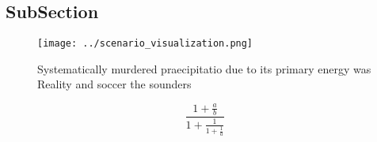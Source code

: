 \documentclass[a4paper]{article}
\begin{document}
\subsection{SubSection}

\begin{figure}
\centering
\texttt{[image: ../scenario\_visualization.png]}
\caption{Systematically murdered praecipitatio due to its primary energy was Reality and soccer the sounders
}
\end{figure}
 
\[ \frac{1+\frac{a}{b}}{1+\frac{1}{1+\frac{1}{a}}} \]
\end{document}

